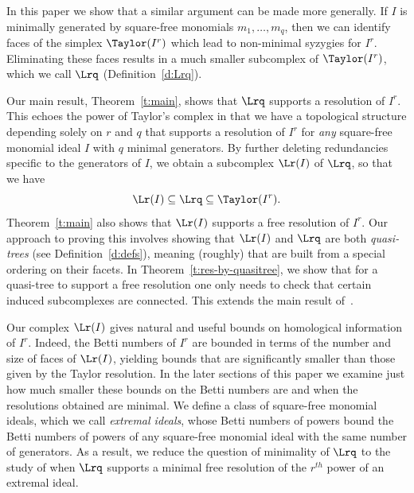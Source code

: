 In this paper we show that a similar argument can be made more
generally.  If $I$ is minimally generated by square-free monomials
$m_1,\ldots,m_q$, then we can identify faces of the simplex
$\Taylor(I^r)$ which lead to non-minimal syzygies for $I^r$.
Eliminating these faces results in a much smaller subcomplex of
$\Taylor(I^r)$, which we call $\Lrq$ \textup{(}Definition~\ref{d:Lrq}\textup{)}.

Our main result, Theorem~\ref{t:main}, shows that $\Lrq$ supports a
resolution of $I^r$.  This echoes the power of Taylor's complex in
that we have a topological structure depending solely on $r$ and $q$
that supports a resolution of $I^r$ for \textit{any} square-free
monomial ideal $I$ with $q$ minimal generators.
By further deleting redundancies specific to the generators of $I$, we obtain a subcomplex $\Lr(I)$ of $\Lrq$, so that we have
$$\Lr(I) \subseteq \Lrq \subseteq \Taylor(I^r).$$ Theorem~\ref{t:main} also shows
that $\Lr(I)$ supports a free resolution of $I^r$.  Our approach
to proving this involves showing that $\Lr(I)$ and $\Lrq$ are both
\textit{quasi-trees} \textup{(}see Definition~\ref{d:defs}\textup{)}, meaning \textup{(}roughly\textup{)} that are
built from a special ordering on their facets. In
Theorem~\ref{t:res-by-quasitree}, we show that for a quasi-tree to support a
free resolution one only needs to check that certain induced subcomplexes are
connected. This extends the main result of~\cite{F14}.


Our complex $\Lr(I)$ gives natural and useful bounds on homological
information of $I^r$.  Indeed, the Betti numbers of $I^r$ are bounded
in terms of the number and size of faces of $\Lr(I)$, yielding bounds
that are significantly smaller than those given by the Taylor
resolution.  In the later sections of this paper we examine just how
much smaller these bounds on the Betti numbers are and when the
resolutions obtained are minimal.  We define a class of square-free
monomial ideals, which we call \textit{extremal ideals}, whose Betti
numbers of powers bound the Betti numbers of powers of any square-free
monomial ideal with the same number of generators. As a result, we
reduce the question of minimality of $\Lrq$ to the study of when
$\Lrq$ supports a minimal free resolution of the $r^{th}$ power of an
extremal ideal.

